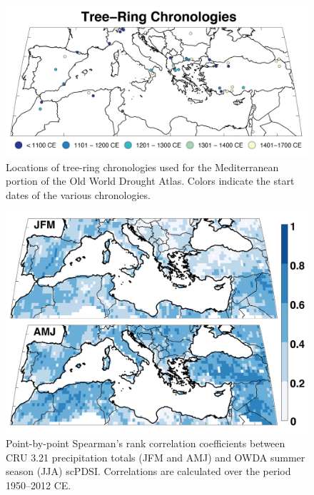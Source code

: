 \documentclass[draft,jgr]{AGUTeX}
\begin{document}

\newpage

\begin{figure}
\center
\includegraphics[width=1.0\columnwidth]{fig_01_map_sites.png}
\caption{Locations of tree-ring chronologies used for the Mediterranean portion of the Old World Drought Atlas. Colors indicate the start dates of the various chronologies.}\label{placeholder}
\end{figure}

\begin{figure}
\center
\includegraphics[width=0.9\columnwidth]{fig_02_corr_owda_prec_MED1.png}
\caption{Point-by-point Spearman's rank correlation coefficients between CRU 3.21 precipitation totals (JFM and AMJ) and OWDA summer season (JJA) scPDSI. Correlations are calculated over the period 1950--2012 CE.}\label{placeholder}
\end{figure}
\end{document}
